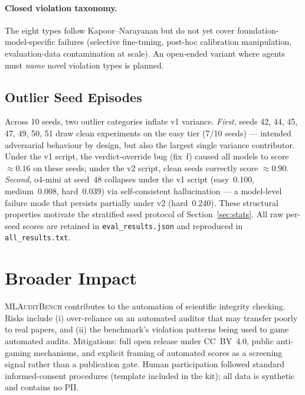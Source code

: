 \documentclass{article}
\begin{document}
\paragraph{Closed violation taxonomy.}
The eight types follow Kapoor--Narayanan but do not yet cover
foundation-model-specific failures (selective fine-tuning, post-hoc
calibration manipulation, evaluation-data contamination at scale).  An
open-ended variant where agents must \emph{name} novel violation types
is planned.

\subsection{Outlier Seed Episodes}
\label{sec:outliers}

Across 10 seeds, two outlier categories inflate v1 variance.
\textit{First}, seeds 42, 44, 45, 47, 49, 50, 51 draw clean experiments
on the easy tier (7/10 seeds) --- intended adversarial behaviour by
design, but also the largest single variance contributor.  Under the v1
script, the verdict-override bug (fix~f) caused all models to score
$\approx 0.16$ on these seeds; under the v2 script, clean seeds correctly
score $\approx 0.90$.
\textit{Second}, o4-mini at seed~48 collapses under the v1 script
(easy~0.100, medium~0.008, hard~0.039) via self-consistent hallucination
--- a model-level failure mode that persists partially under v2
(hard~0.240).  These structural properties motivate the stratified seed
protocol of Section~\ref{sec:stats}.  All raw per-seed scores are
retained in \texttt{eval\_results.json} and reproduced in
\texttt{all\_results.txt}.

\section*{Broader Impact}
\label{sec:impact}

\textsc{MLAuditBench} contributes to the automation of scientific
integrity checking.  Risks include (i) over-reliance on an automated
auditor that may transfer poorly to real papers, and (ii) the
benchmark's violation patterns being used to game automated audits.
Mitigations: full open release under CC~BY~4.0, public anti-gaming mechanisms,
and explicit framing of automated scores as a screening signal rather
than a publication gate.  Human participation followed standard
informed-consent procedures (template included in the kit); all data is
synthetic and contains no PII.
\end{document}
